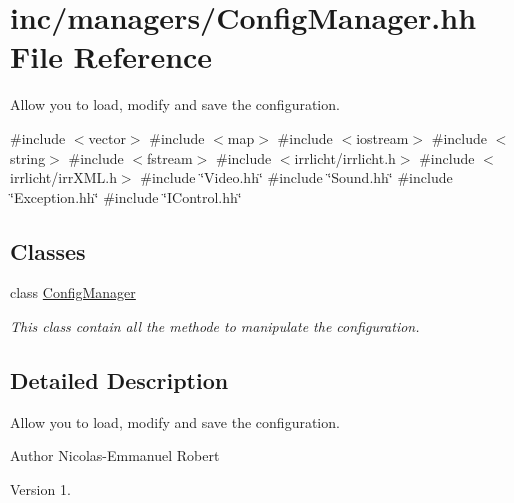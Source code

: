 \hypertarget{ConfigManager_8hh}{}\section{inc/managers/\+Config\+Manager.hh File Reference}
\label{ConfigManager_8hh}


Allow you to load, modify and save the configuration.  


{\ttfamily \#include $<$vector$>$}\newline
{\ttfamily \#include $<$map$>$}\newline
{\ttfamily \#include $<$iostream$>$}\newline
{\ttfamily \#include $<$string$>$}\newline
{\ttfamily \#include $<$fstream$>$}\newline
{\ttfamily \#include $<$irrlicht/irrlicht.\+h$>$}\newline
{\ttfamily \#include $<$irrlicht/irr\+X\+M\+L.\+h$>$}\newline
{\ttfamily \#include \char`\"{}Video.\+hh\char`\"{}}\newline
{\ttfamily \#include \char`\"{}Sound.\+hh\char`\"{}}\newline
{\ttfamily \#include \char`\"{}Exception.\+hh\char`\"{}}\newline
{\ttfamily \#include \char`\"{}I\+Control.\+hh\char`\"{}}\newline
\subsection*{Classes}
\begin{DoxyCompactItemize}
\item 
class \hyperlink{classConfigManager}{Config\+Manager}
\begin{DoxyCompactList}\small\item\em This class contain all the methode to manipulate the configuration. \end{DoxyCompactList}\end{DoxyCompactItemize}


\subsection{Detailed Description}
Allow you to load, modify and save the configuration. 

\begin{DoxyAuthor}{Author}
Nicolas-\/\+Emmanuel Robert 
\end{DoxyAuthor}
\begin{DoxyVersion}{Version}
1. 
\end{DoxyVersion}
